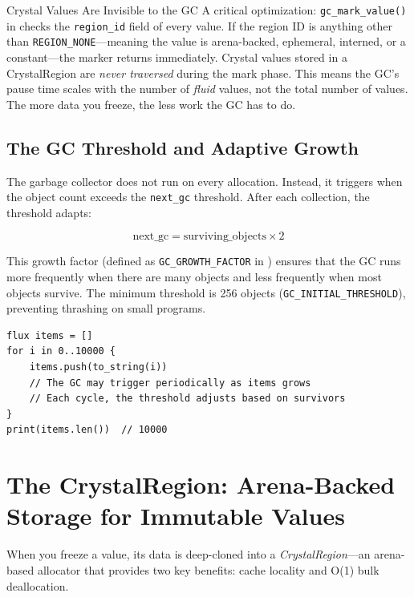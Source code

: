 \begin{notebox}{Crystal Values Are Invisible to the GC}
A critical optimization: \lstinline|gc_mark_value()| in  checks the \lstinline|region_id| field of every value.
If the region ID is anything other than \lstinline|REGION_NONE|---meaning the value is arena-backed, ephemeral, interned, or a constant---the marker returns immediately.
Crystal values stored in a CrystalRegion are \emph{never traversed} during the mark phase.
This means the GC's pause time scales with the number of \emph{fluid} values, not the total number of values.
The more data you freeze, the less work the GC has to do.
\end{notebox}

\subsection{The GC Threshold and Adaptive Growth}

The garbage collector does not run on every allocation.
Instead, it triggers when the object count exceeds the \lstinline|next_gc| threshold.
After each collection, the threshold adapts:

\[
\text{next\_gc} = \text{surviving\_objects} \times 2
\]

This growth factor (defined as \lstinline|GC_GROWTH_FACTOR| in ) ensures that the GC runs more frequently when there are many objects and less frequently when most objects survive.
The minimum threshold is 256 objects (\lstinline|GC_INITIAL_THRESHOLD|), preventing thrashing on small programs.

\begin{lstlisting}[language=Lattice, caption={Adaptive GC in action}]
flux items = []
for i in 0..10000 {
    items.push(to_string(i))
    // The GC may trigger periodically as items grows
    // Each cycle, the threshold adjusts based on survivors
}
print(items.len())  // 10000
\end{lstlisting}


\section{The CrystalRegion: Arena-Backed Storage for Immutable Values}\label{sec:crystal-region}


When you freeze a value, its data is deep-cloned into a \emph{CrystalRegion}---an arena-based allocator that provides two key benefits: cache locality and O(1) bulk deallocation.

